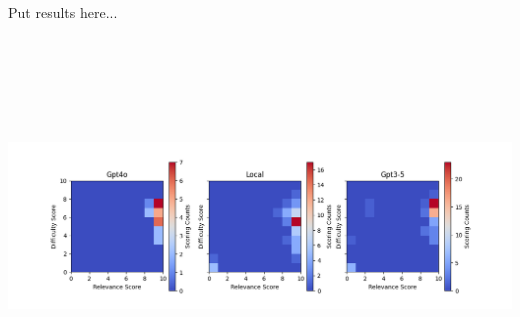 
{
    Put results here...

    \begin{tikzfigure}
        \vspace*{-1cm}
        \includegraphics[height=10cm]{figures/eval_plot.png}
    \end{tikzfigure}
    \vspace*{-2cm}
}